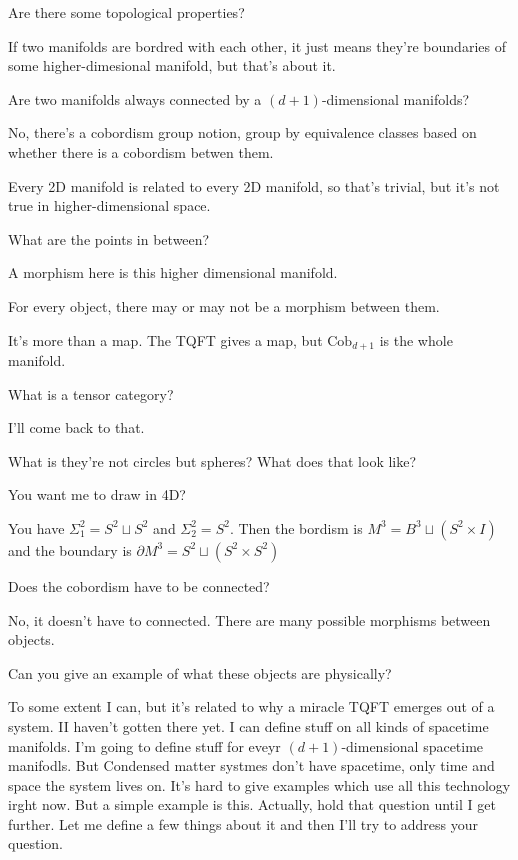 \begin{question}
    Are there some topological properties?
\end{question}
If two manifolds are bordred with each other,
it just means they're boundaries of some higher-dimesional manifold,
but that's about it.

\begin{question}
    Are two manifolds always connected by a $(d+1)$-dimensional manifolds?
\end{question}
No, there's a cobordism group notion,
group by equivalence classes based on whether there is a cobordism betwen them.

Every 2D manifold is related to every 2D manifold,
so that's trivial,
but it's not true in higher-dimensional space.

\begin{question}
    What are the points in between?
\end{question}
A morphism here is this higher dimensional manifold.

For every object, there may or may not be a morphism between them.

It's more than a map.
The TQFT gives a map, but $\mathrm{Cob}_{d+1}$ is the whole manifold.


\begin{question}
    What is a tensor category?
\end{question}
I'll come back to that.

\begin{question}
    What is they're not circles but spheres?
    What does that look like?
\end{question}
You want me to draw in 4D?\@

You have $\Sigma_1^2 = S^2 \sqcup S^2$ and
$\Sigma_2^2=S^2$.
Then the bordism is
$M^3 = B^3\sqcup (S^2\times I)$
and the boundary is
$\partial M^3 = S^2 \sqcup (S^2 \times S^2)$

\begin{question}
    Does the cobordism have to be connected?
\end{question}
No, it doesn't have to connected.
There are many possible morphisms between objects.

\begin{question}
    Can you give an example of what these objects are physically?
\end{question}
To some extent I can,
but it's related to why a miracle TQFT emerges out of a system.
II haven't gotten there yet.
I can define stuff on all kinds of spacetime manifolds.
I'm going to define stuff for eveyr $(d+1)$-dimensional spacetime manifodls.
But Condensed matter systmes don't have spacetime,
only time and space the system lives on.
It's hard to give examples which use all this technology irght now.
But a simple example is this.
Actually, hold that question until I get further.
Let me define a few things about it and then I'll try to address your question.


